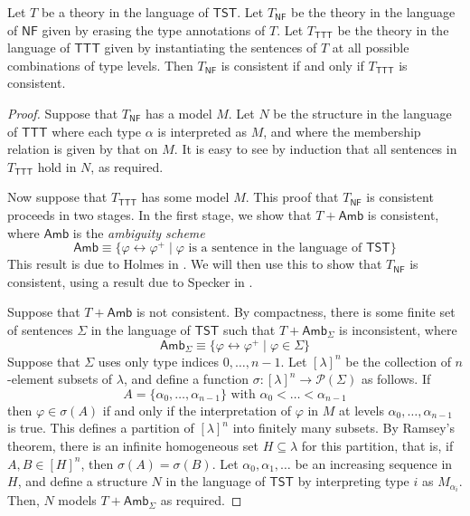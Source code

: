 \begin{theorem}
    \label{thm:nf_ttt}
    Let \( T \) be a theory in the language of \( \mathsf{TST} \).
    Let \( T_{\mathsf{NF}} \) be the theory in the language of \( \mathsf{NF} \) given by erasing the type annotations of \( T \).
    Let \( T_{\mathsf{TTT}} \) be the theory in the language of \( \mathsf{TTT} \) given by instantiating the sentences of \( T \) at all possible combinations of type levels.
    Then \( T_{\mathsf{NF}} \) is consistent if and only if \( T_{\mathsf{TTT}} \) is consistent.
\end{theorem}
\begin{proof}
    Suppose that \( T_{\mathsf{NF}} \) has a model \( M \).
    Let \( N \) be the structure in the language of \( \mathsf{TTT} \) where each type \( \alpha \) is interpreted as \( M \), and where the membership relation is given by that on \( M \).
    It is easy to see by induction that all sentences in \( T_{\mathsf{TTT}} \) hold in \( N \), as required.

    Now suppose that \( T_{\mathsf{TTT}} \) has some model \( M \).
    This proof that \( T_{\mathsf{NF}} \) is consistent proceeds in two stages.
    In the first stage, we show that \( T + \mathsf{Amb} \) is consistent, where \( \mathsf{Amb} \) is the \emph{ambiguity scheme}
    \[ \mathsf{Amb} \equiv \{ \varphi \leftrightarrow \varphi^+ \mid \varphi \text{ is a sentence in the language of } \mathsf{TST} \} \]
    This result is due to Holmes in \cite{holmes-ttt}.
    We will then use this to show that \( T_{\mathsf{NF}} \) is consistent, using a result due to Specker in \cite{typical-ambiguity}.

    Suppose that \( T + \mathsf{Amb} \) is not consistent.
    By compactness, there is some finite set of sentences \( \Sigma \) in the language of \( \mathsf{TST} \) such that \( T + \mathsf{Amb}_\Sigma \) is inconsistent, where
    \[ \mathsf{Amb}_\Sigma \equiv \{ \varphi \leftrightarrow \varphi^+ \mid \varphi \in \Sigma \} \]
    Suppose that \( \Sigma \) uses only type indices \( 0, \dots, n - 1 \).
    Let \( [\lambda]^n \) be the collection of \( n \)-element subsets of \( \lambda \), and define a function \( \sigma : [\lambda]^n \to \mathcal P(\Sigma) \) as follows.
    If
    \[ A = \{\alpha_0, \dots, \alpha_{n-1}\} \text{ with } \alpha_0 < \dots < \alpha_{n-1} \]
    then \( \varphi \in \sigma(A) \) if and only if the interpretation of \( \varphi \) in \( M \) at levels \( \alpha_0, \dots, \alpha_{n-1} \) is true.
    This defines a partition of \( [\lambda]^n \) into finitely many subsets.
    By Ramsey's theorem, there is an infinite homogeneous set \( H \subseteq \lambda \) for this partition, that is, if \( A, B \in [H]^n \), then \( \sigma(A) = \sigma(B) \).
    Let \( \alpha_0, \alpha_1, \dots \) be an increasing sequence in \( H \), and define a structure \( N \) in the language of \( \mathsf{TST} \) by interpreting type \( i \) as \( M_{\alpha_i} \).
    Then, \( N \) models \( T + \mathsf{Amb}_\Sigma \) as required.


\end{proof}
